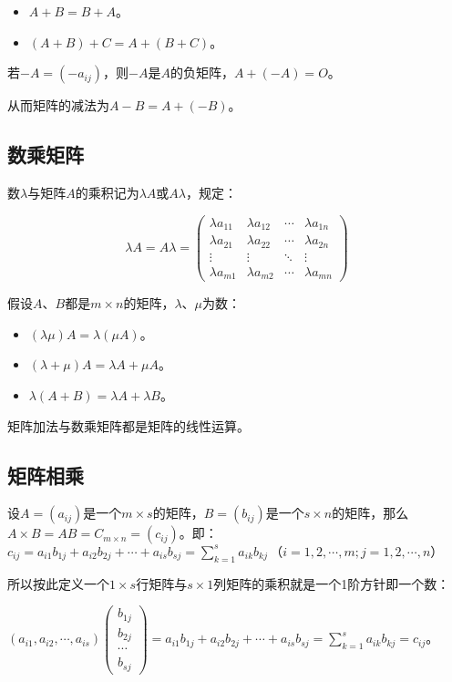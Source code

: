 \documentclass[UTF8, 12pt]{ctexart}
\begin{document}
\begin{itemize}
    \item $A+B=B+A$。
    \item $(A+B)+C=A+(B+C)$。
\end{itemize}

若$-A=(-a_{ij})$，则$-A$是$A$的负矩阵，$A+(-A)=O$。

从而矩阵的减法为$A-B=A+(-B)$。

\subsection{数乘矩阵}

数$\lambda$与矩阵$A$的乘积记为$\lambda A$或$A\lambda$，规定：

$$\lambda A=A\lambda=\left(
    \begin{array}{cccc}
        \lambda a_{11} & \lambda a_{12} & \cdots & \lambda a_{1n} \\
        \lambda a_{21} & \lambda a_{22} & \cdots & \lambda a_{2n} \\
        \vdots & \vdots & \ddots & \vdots \\
        \lambda a_{m1} & \lambda a_{m2} & \cdots & \lambda a_{mn}
    \end{array}
\right)$$

假设$A$、$B$都是$m\times n$的矩阵，$\lambda$、$\mu$为数：

\begin{itemize}
    \item $(\lambda\mu)A=\lambda(\mu A)$。
    \item $(\lambda+\mu)A=\lambda A+\mu A$。
    \item $\lambda(A+B)=\lambda A+\lambda B$。
\end{itemize}

矩阵加法与数乘矩阵都是矩阵的线性运算。

\subsection{矩阵相乘}

设$A=(a_{ij})$是一个$m\times s$的矩阵，$B=(b_{ij})$是一个$s\times n$的矩阵，那么$A\times B=AB=C_{m\times n}=(c_{ij})$。即：$c_{ij}=a_{i1}b_{1j}+a_{i2}b_{2j}+\cdots+a_{is}b_{sj}=\sum\limits_{k=1}^sa_{ik}b_{kj}\,\text{（}i=1,2,\cdots,m;j=1,2,\cdots,n\text{）}$

所以按此定义一个$1\times s$行矩阵与$s\times 1$列矩阵的乘积就是一个1阶方针即一个数：

$(a_{i1},a_{i2},\cdots,a_{is})\left(
    \begin{array}{c}
        b_{1j} \\
        b_{2j} \\
        \cdots \\
        b_{sj}
    \end{array}
\right)=a_{i1}b_{1j}+a_{i2}b_{2j}+\cdots+a_{is}b_{sj}=\sum\limits_{k=1}^sa_{ik}b_{kj}=c_{ij}$。
\end{document}
